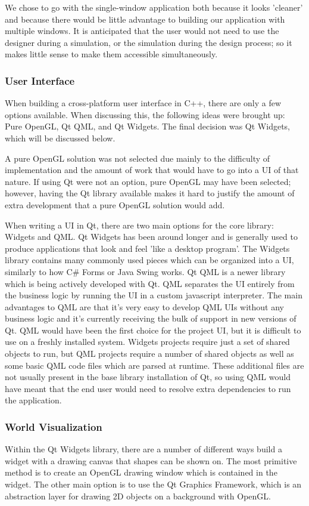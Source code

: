 We chose to go with the single-window application both because it looks 'cleaner' and because there would be little advantage to building our application with multiple windows. It is anticipated that the user would not need to use the designer during a simulation, or the simulation during the design process; so it makes little sense to make them accessible simultaneously.  
 
 
 \subsubsection*{User Interface}
 	When building a cross-platform user interface in C++, there are only a few options available. When discussing this, the following ideas were brought up: Pure OpenGL, Qt QML, and Qt Widgets. The final decision was Qt Widgets, which will be discussed below.
 	
 	A pure OpenGL solution was not selected due mainly to the difficulty of implementation and the amount of work that would have to go into a UI of that nature. If using Qt were not an option, pure OpenGL may have been selected; however, having the Qt library available makes it hard to justify the amount of extra development that a pure OpenGL solution would add.
 	
 	When writing a UI in Qt, there are two main options for the core library: Widgets and QML. Qt Widgets has been around longer and is generally used to produce applications that look and feel 'like a desktop program'. The Widgets library contains many commonly used pieces which can be organized into a UI, similarly to how C\# Forms or Java Swing works. Qt QML is a newer library which is being actively developed with Qt. QML separates the UI entirely from the business logic by running the UI in a custom javascript interpreter. The main advantages to QML are that it's very easy to develop QML UIs without any business logic and it's currently receiving the bulk of support in new versions of Qt. QML would have been the first choice for the project UI, but it is difficult to use on a freshly installed system. Widgets projects require just a set of shared objects to run, but QML projects require a number of shared objects as well as some basic QML code files which are parsed at runtime. These additional files are not usually present in the base library installation of Qt, so using QML would have meant that the end user would need to resolve extra dependencies to run the application.
 	
 	\subsubsection*{World Visualization}
 	Within the Qt Widgets library, there are a number of different ways build a widget with a drawing canvas that shapes can be shown on. The most primitive method is to create an OpenGL drawing window which is contained in the widget. The other main option is to use the Qt Graphics Framework, which is an abstraction layer for drawing 2D objects on a background with OpenGL.
 	
